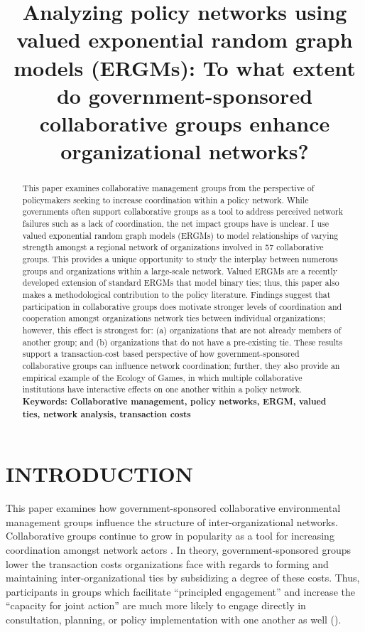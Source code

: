 \documentclass[12pt,a4paper,titlepage]{article}
\title{Analyzing policy networks using valued exponential random graph models (ERGMs): To what extent do government-sponsored collaborative groups enhance organizational networks?}
\begin{document}
\singlespacing
\maketitle

\begin{abstract}
\doublespacing

This paper examines collaborative management groups from the perspective of policymakers seeking to increase coordination within a policy network. While governments often support collaborative groups as a tool to address perceived network failures such as a lack of coordination, the net impact groups have is unclear. I use valued exponential random graph models (ERGMs) to model relationships of varying strength amongst a regional network of organizations involved in 57 collaborative groups. This provides a unique opportunity to study the interplay between numerous groups and organizations within a large-scale network. Valued ERGMs are a recently developed extension of standard ERGMs that model binary ties; thus, this paper also makes a methodological contribution to the policy literature. Findings suggest that participation in collaborative groups does motivate stronger levels of coordination and cooperation amongst organizations network ties between individual organizations; however, this effect is strongest for: (a) organizations that are not already members of another group; and (b) organizations that do not have a pre-existing tie. These results support a transaction-cost based perspective of how government-sponsored collaborative groups can influence network coordination; further, they also provide an empirical example of the Ecology of Games, in which multiple collaborative institutions have interactive effects on one another within a policy network.\\



\noindent
\bf{Keywords}: Collaborative management, policy networks, ERGM, valued ties, network analysis, transaction costs
\end{abstract}

\doublespacing
\section{\bf\MakeUppercase{Introduction}}

This paper examines how government-sponsored collaborative environmental management groups influence the structure of inter-organizational networks. Collaborative groups continue to grow in popularity as a tool for increasing coordination amongst network actors \parencite{margerum2011}. In theory, government-sponsored groups lower the transaction costs organizations face with regards to forming and maintaining inter-organizational ties by subsidizing a degree of these costs. Thus, participants in groups which facilitate ``principled engagement'' and increase the ``capacity for joint action'' \parencite{emerson2012} are much more likely to engage directly in consultation, planning, or policy implementation with one another as well (\parencite{scott2015}).
\end{document}

